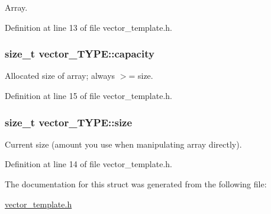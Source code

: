 \-Array. 



\-Definition at line 13 of file vector\-\_\-template.\-h.

\hypertarget{structvector___t_y_p_e_aa2f337cea7d3cb1e1ed4f5ee5a22678f}{
\subsubsection[{capacity}]{\setlength{\rightskip}{0pt plus 5cm}size\-\_\-t {\bf vector\-\_\-\-T\-Y\-P\-E\-::capacity}}}\label{structvector___t_y_p_e_aa2f337cea7d3cb1e1ed4f5ee5a22678f}


\-Allocated size of array; always $>$= size. 



\-Definition at line 15 of file vector\-\_\-template.\-h.

\hypertarget{structvector___t_y_p_e_a5c187692d3e0d1659d7024a751ec4b4d}{
\subsubsection[{size}]{\setlength{\rightskip}{0pt plus 5cm}size\-\_\-t {\bf vector\-\_\-\-T\-Y\-P\-E\-::size}}}\label{structvector___t_y_p_e_a5c187692d3e0d1659d7024a751ec4b4d}


\-Current size (amount you use when manipulating array directly). 



\-Definition at line 14 of file vector\-\_\-template.\-h.



\-The documentation for this struct was generated from the following file\-:\begin{DoxyCompactItemize}
\item 
\hyperlink{vector__template_8h}{vector\-\_\-template.\-h}\end{DoxyCompactItemize}
